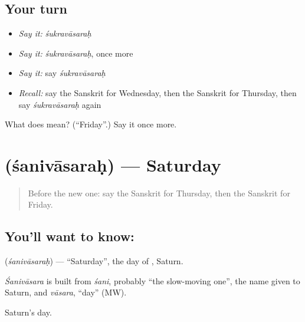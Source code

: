 \subsection*{Your turn}
\begin{itemize}
\raggedright
  \item \emph{Say it:} \emph{śukravāsaraḥ}
  \item \emph{Say it:} \emph{śukravāsaraḥ}, once more
  \item \emph{Say it:} say \emph{śukravāsaraḥ}
  \item \emph{Recall:} say the Sanskrit for Wednesday, then the Sanskrit for Thursday, then say \emph{śukravāsaraḥ} again
\end{itemize}

\begin{tcolorbox}[breakable,colback=teal!4,colframe=teal!35!black,title={Before you move on}]
What does  mean? (\textquotedblleft{}Friday\textquotedblright{}.) Say it once more.
\end{tcolorbox}
\section[\texorpdfstring{\sk{शनिवासरः} (śanivāsaraḥ)}{शनिवासरः (śanivāsaraḥ)}]{ (śanivāsaraḥ) — Saturday}

\label{lesson:SA-C86-saturday}



\begin{quote}
Before the new one: say the Sanskrit for Thursday, then the Sanskrit for Friday.
\end{quote}

\subsection*{You'll want to know: }
\textbf{} (\emph{śanivāsaraḥ}) — \textquotedblleft{}Saturday\textquotedblright{}, the day of \textbf{}, Saturn.

\begin{cousinweb}
\emph{Śanivāsara} is built from \emph{śani}, probably \textquotedblleft{}the slow-moving one\textquotedblright{}, the name given to Saturn, and \emph{vāsara}, \textquotedblleft{}day\textquotedblright{} (MW).
\end{cousinweb}

\begin{grammarlens}[title={What you've built}]
Saturn's day.
\end{grammarlens}

